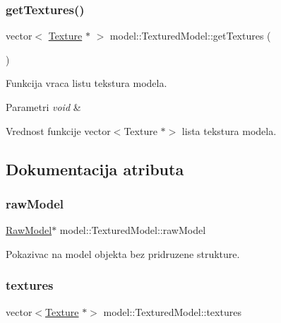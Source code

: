 \subsubsection{\texorpdfstring{get\+Textures()}{getTextures()}}
{\footnotesize\ttfamily vector$<$ \hyperlink{classtexture_1_1Texture}{Texture} $\ast$ $>$ model\+::\+Textured\+Model\+::get\+Textures (\begin{DoxyParamCaption}\item[{void}]{ }\end{DoxyParamCaption})}



Funkcija vraca listu tekstura modela. 


\begin{DoxyParams}{Parametri}
{\em void} & \\
\hline
\end{DoxyParams}
\begin{DoxyReturn}{Vrednost funkcije}
vector$<$\+Texture $\ast$$>$ lista tekstura modela. 
\end{DoxyReturn}


\subsection{Dokumentacija atributa}
\mbox{\label{classmodel_1_1TexturedModel_ac6157368c7e55a78aa02f9546f5f2dc3}} 
\subsubsection{\texorpdfstring{raw\+Model}{rawModel}}
{\footnotesize\ttfamily \hyperlink{classmodel_1_1RawModel}{Raw\+Model}$\ast$ model\+::\+Textured\+Model\+::raw\+Model\hspace{0.3cm}{\ttfamily [private]}}



Pokazivac na model objekta bez pridruzene strukture. 

\mbox{\label{classmodel_1_1TexturedModel_a890c463573c2240f60f29471fb28b419}} 
\subsubsection{\texorpdfstring{textures}{textures}}
{\footnotesize\ttfamily vector$<$\hyperlink{classtexture_1_1Texture}{Texture} $\ast$$>$ model\+::\+Textured\+Model\+::textures\hspace{0.3cm}{\ttfamily [private]}}



